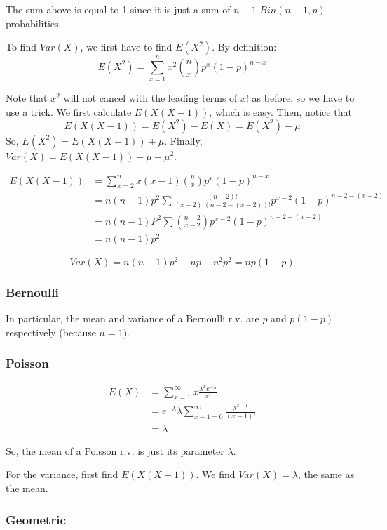 \documentclass[12pt]{article}
\begin{document}
The sum above is equal to 1 since it is just a sum of $n-1$ $Bin(n-1,p)$ probabilities.

To find $Var(X)$, we first have to find $E(X^2)$. By definition:
\[
    E(X^2) = \sum_{x=1}^{n} x^2 {n \choose x} p^x (1-p)^{n-x}
\]

Note that $x^2$ will not cancel with the leading terms of $x!$ as before, so we have to use a trick. We first calculate $E(X(X-1))$, which is easy. Then, notice that
\[
    E(X (X-1)) = E(X^2) - E(X) = E(X^2) - \mu
\]
So, $E(X^2) = E(X(X-1)) + \mu$. Finally, $Var(X) = E(X(X-1)) + \mu - \mu^2$.

\begin{align*}
    E(X(X-1)) &= \sum_{x=2}^{n} x (x-1) {n \choose x} p^x (1-p)^{n-x} \\
        &= n (n-1) p^2 \sum \frac{(n-2)!}{(x-2)! (n-2-(x-2))!} p^{x-2} (1-p)^{n-2-(x-2)} \\
        &= n (n-1) P^2 \sum {{n-2} \choose {x-2}} p^{x-2} (1-p)^{n-2-(x-2)} \\
        &= n (n-1) p^2
\end{align*}

\[
    Var(X) = n (n-1) p^2 + np - n^2 p^2 = n p (1-p)
\]

\subsubsection{Bernoulli}

In particular, the mean and variance of a Bernoulli r.v. are $p$ and $p (1-p)$ respectively (because $n=1$).

\subsubsection{Poisson}

\begin{align*}
    E(X) &= \sum_{x=1}^{\infty} x \frac{\lambda^{x} e^{- \lambda}}{x!} \\
        &= e^{- \lambda} \lambda \sum_{x-1 = 0}^{\infty} \frac{\lambda^{x-1}}{(x-1)!} \\
        &= \lambda
\end{align*}

So, the mean of a Poisson r.v. is just its parameter $\lambda$.

For the variance, first find $E(X(X-1))$. We find $Var(X) = \lambda$, the same as the mean.

\subsubsection{Geometric}
\end{document}
